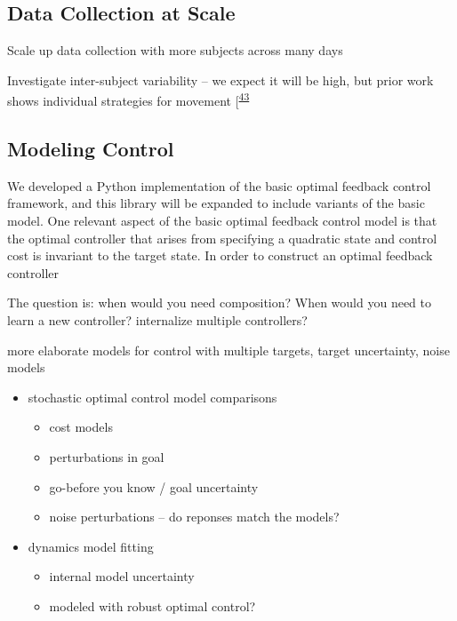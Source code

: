 \documentclass[
  a4paper,
]{article}
\providecommand{\tightlist}{%
  \setlength{\itemsep}{0pt}\setlength{\parskip}{0pt}}
\begin{document}
\hypertarget{data-collection-at-scale}{%
\subsection{Data Collection at Scale}\label{data-collection-at-scale}}

Scale up data collection with more subjects across many days

Investigate inter-subject variability -- we expect it will be high, but
prior work shows individual strategies for movement
{[}\textsuperscript{\protect\hyperlink{ref-crouzierIndividualDifferencesDistribution2019}{43}}

\hypertarget{modeling-control}{%
\subsection{Modeling Control}\label{modeling-control}}

We developed a Python implementation of the basic optimal feedback
control framework, and this library will be expanded to include variants
of the basic model. One relevant aspect of the basic optimal feedback
control model is that the optimal controller that arises from specifying
a quadratic state and control cost is invariant to the target state. In
order to construct an optimal feedback controller

The question is: when would you need composition? When would you need to
learn a new controller? internalize multiple controllers?

more elaborate models for control with multiple targets, target
uncertainty, noise models

\begin{itemize}
\tightlist
\item
  stochastic optimal control model comparisons

  \begin{itemize}
  \tightlist
  \item
    cost models
  \item
    perturbations in goal
  \item
    go-before you know / goal uncertainty
  \item
    noise perturbations -- do reponses match the models?
  \end{itemize}
\item
  dynamics model fitting

  \begin{itemize}
  \tightlist
  \item
    internal model uncertainty
  \item
    modeled with robust optimal control?
  \end{itemize}
\end{itemize}
\end{document}
